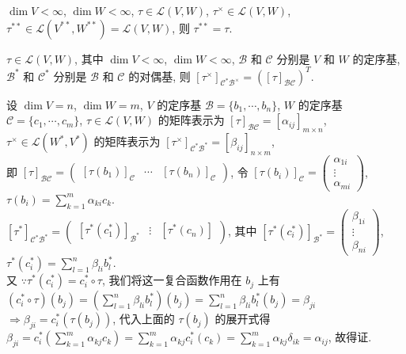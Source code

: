 \documentclass{note}
\begin{document}
\begin{thm}[(课本定理 3.18)]
    $\dim V<\infty$, $\dim W<\infty$, $\tau\in\mathcal{L}(V,W)$, $\tau^{\times}\in\mathcal{L}(V,W)$, $\tau^{**}\in\mathcal{L}(V^{**},W^{**})=\mathcal{L}(V,W)$, 则 $\tau^{**}=\tau$.
\end{thm}

\begin{thm}[(课本定理 3.22)]
    $\tau\in\mathcal{L}(V,W)$, 其中 $\dim V<\infty$, $\dim W<\infty$, $\mathcal{B}$ 和 $\mathcal{C}$ 分别是 $V$ 和 $W$ 的定序基, $\mathcal{B}^*$ 和 $\mathcal{C}^*$ 分别是 $\mathcal{B}$ 和 $\mathcal{C}$ 的对偶基, 则 $[\tau^{\times}]_{\mathcal{C}^*\mathcal{B}^{\times}}=([\tau]_{\mathcal{BC}})^T$.
\end{thm}
\begin{pf}
    设 $\dim V=n$, $\dim W=m$, $V$ 的定序基 $\mathcal{B}=\{b_1,\cdots,b_n\}$, $W$ 的定序基 $\mathcal{C}=\{c_1,\cdots,c_m\}$, $\tau\in\mathcal{L}(V,W)$ 的矩阵表示为 $[\tau]_{\mathcal{BC}}=[\alpha_{ij}]_{m\times n}$, $\tau^{\times}\in\mathcal{L}(W^*,V^*)$ 的矩阵表示为 $[\tau^{\times}]_{\mathcal{C}^*\mathcal{B}^*}=[\beta_{ij}]_{n\times m}$,\\
    即 $[\tau]_{\mathcal{BC}}=\begin{pmatrix}
        [\tau(b_1)]_{\mathcal{C}}&\cdots&[\tau(b_n)]_{\mathcal{C}}
    \end{pmatrix}$, 令 $[\tau(b_i)]_{\mathcal{C}}=\begin{pmatrix}
        \alpha_{1i}\\
        \vdots\\
        \alpha_{mi}
    \end{pmatrix}$, $\tau(b_i)=\sum_{k=1}^m\alpha_{ki}c_k$.\\
    $[\tau^*]_{\mathcal{C}^*\mathcal{B}^*}=\begin{pmatrix}
        [\tau^*(c_1^*)]_{\mathcal{B^*}}&\vdots&[\tau^*(c_n)]
    \end{pmatrix}$, 其中 $[\tau^*(c_i^*)]_{\mathcal{B}^*}=\begin{pmatrix}
        \beta_{1i}\\
        \vdots\\
        \beta_{ni}
    \end{pmatrix}$, $\tau^*(c_i^*)=\sum_{l=1}^n\beta_{li}b_l^*$.\\
    又 $\because\tau^*(c_i^*)=c_i^*\circ\tau$, 我们将这一复合函数作用在 $b_j$ 上有 $(c_i^*\circ\tau)(b_j)=\left(\sum_{l=1}^n\beta_{li}b_l^*\right)(b_j)=\sum_{l=1}^n\beta_{li}b_l^*(b_j)=\beta_{ji}$\\
    $\Longrightarrow\beta_{ji}=c_i^*(\tau(b_j))$, 代入上面的 $\tau(b_j)$ 的展开式得 $\beta_{ji}=c_i^*\left(\sum_{k=1}^m\alpha_{kj}c_k\right)=\sum_{k=1}^m\alpha_{kj}c_i^*(c_k)=\sum_{k=1}^m\alpha_{kj}\delta_{ik}=\alpha_{ij}$, 故得证.
\end{pf}
\ifx\allfiles\undefined
\end{document}
